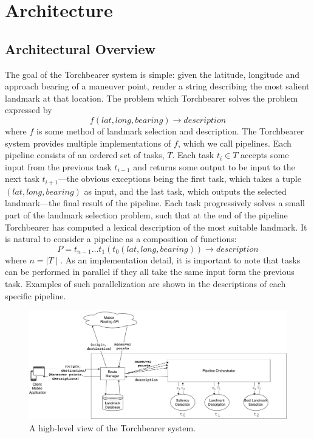 \chapter{Architecture} \label{CH:architecture}

\section{Architectural Overview}\label{sec:arch:overview}
The goal of the Torchbearer system is simple: given the latitude, longitude and approach bearing of a maneuver point, render a string describing the most salient landmark at that location. The problem which Torchbearer solves the problem expressed by
\begin{equation}\label{eq:problem}
    f(lat, long, bearing) \longrightarrow description
\end{equation}
where $f$ is some method of landmark selection and description. The Torchbearer system provides multiple implementations of $f$, which we call pipelines. Each pipeline consists of an ordered set of tasks, $T$. Each task $t_i \in T$ accepts some input from the previous task $t_{i-1}$ and returns some output to be input to the next task $t_{i+1}$---the obvious exceptions being the first task, which takes a tuple $(lat, long, bearing)$ as input, and the last task, which outputs the selected landmark---the final result of the pipeline. Each task progressively solves a small part of the landmark selection problem, such that at the end of the pipeline Torchbearer has computed a lexical description of the most suitable landmark. It is natural to consider a pipeline as a composition of functions:
\begin{equation}\label{eq:pipeline}
    P=t_{n-1} \dots t_1(t_0(lat, long, bearing)) \longrightarrow description
\end{equation}
where $n = \mid T \mid$. As an implementation detail, it is important to note that tasks can be performed in parallel if they all take the same input form the previous task. Examples of such parallelization are shown in the descriptions of each specific pipeline.

\begin{figure}[htbp]
  \centering
  \includegraphics[width=\textwidth]{images/Arch.pdf}
  \caption{A high-level view of the Torchbearer system.}
  \label{fig:pipeline:overview}
\end{figure}

